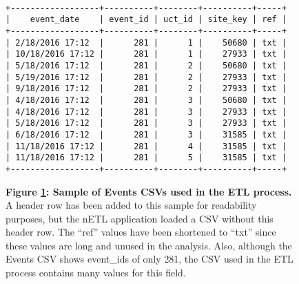 \begin{figure}[H]
  \centering
  \begin{mdframed}
    \centering
\begin{BVerbatim}

+------------------+----------+--------+----------+-----+
|    event_date    | event_id | uct_id | site_key | ref |
+------------------+----------+--------+----------+-----+
| 2/18/2016 17:12  |      281 |      1 |    50680 | txt |
| 10/18/2016 17:12 |      281 |      1 |    27933 | txt |
| 5/18/2016 17:12  |      281 |      2 |    50680 | txt |
| 5/19/2016 17:12  |      281 |      2 |    27933 | txt |
| 9/18/2016 17:12  |      281 |      2 |    27933 | txt |
| 4/18/2016 17:12  |      281 |      3 |    50680 | txt |
| 4/18/2016 17:12  |      281 |      3 |    27933 | txt |
| 5/18/2016 17:12  |      281 |      3 |    27933 | txt |
| 6/18/2016 17:12  |      281 |      3 |    31585 | txt |
| 11/18/2016 17:12 |      281 |      4 |    31585 | txt |
| 11/18/2016 17:12 |      281 |      5 |    31585 | txt |
+------------------+----------+--------+----------+-----+

\end{BVerbatim}
  \end{mdframed}
  \caption[Raw Events CSV Sample]{\textbf{Figure \ref{fig-events-csv-sample}: Sample of Events CSVs used in the ETL process.} A header row has been added to this sample for readability purposes, but the nETL application loaded a CSV without this header row. The ``ref'' values have been shortened to ``txt'' since these values are long and unused in the analysis. Also, although the Events CSV shows event\_ids of only 281, the CSV used in the ETL process contains many values for this field.}
  \label{fig-events-csv-sample}
\end{figure}
